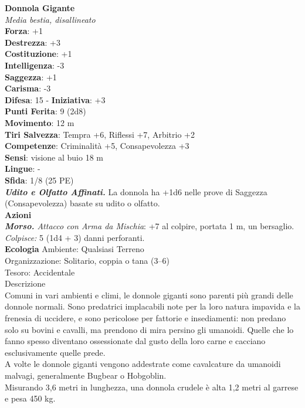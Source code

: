 \begin{multicols}{2}
\medskip\textbf{Donnola Gigante}\\
\emph{Media bestia, disallineato}\\
\textbf{Forza}: +1\\
\textbf{Destrezza}: +3\\
\textbf{Costituzione}: +1\\
\textbf{Intelligenza}: -3\\
\textbf{Saggezza}: +1\\
\textbf{Carisma}: -3\\
\textbf{Difesa}: 15 - \textbf{Iniziativa}: +3\\
\textbf{Punti Ferita}: 9 (2d8)\\
\textbf{Movimento}: 12 m\\
\textbf{Tiri Salvezza}:  Tempra +6, Riflessi +7, Arbitrio +2 \\
\textbf{Competenze}: Criminalità +5, Consapevolezza +3\\
\textbf{Sensi}: visione al buio 18 m\\
\textbf{Lingue}: -\\
\textbf{Sfida}: 1/8 (25 PE)\smallskip\\
\emph{\textbf{Udito e Olfatto Affinati.}} La donnola ha +1d6 nelle prove di Saggezza (Consapevolezza) basate su udito o olfatto.\\
\smallskip\textbf{Azioni}\\
\emph{\textbf{Morso.} Attacco con Arma da Mischia}: +7 al colpire, portata 1 m, un bersaglio.\\
\emph{Colpisce:} 5 (1d4 + 3) danni perforanti.\\
\textbf{Ecologia}
Ambiente: Qualsiasi Terreno\\
Organizzazione: Solitario, coppia o tana (3–6)\\
Tesoro: Accidentale\\
Descrizione\\

Comuni in vari ambienti e climi, le donnole giganti sono parenti più grandi delle donnole normali. Sono predatrici implacabili note per la loro natura impavida e la frenesia di uccidere, e sono pericolose per fattorie e insediamenti: non predano solo su bovini e cavalli, ma prendono di mira persino gli umanoidi. Quelle che lo fanno spesso diventano ossessionate dal gusto della loro carne e cacciano esclusivamente quelle prede.\\
A volte le donnole giganti vengono addestrate come cavalcature da umanoidi malvagi, generalmente Bugbear o Hobgoblin.\\
Misurando 3,6 metri in lunghezza, una donnola crudele è alta 1,2 metri al garrese e pesa 450 kg. \\


\end{multicols}
